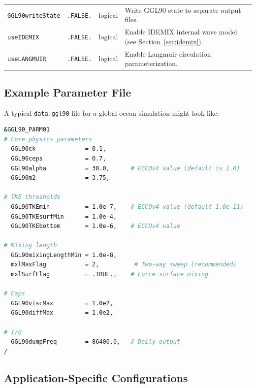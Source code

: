 \documentclass[12pt,letterpaper]{article}
\begin{document}
\begin{table}[h!]
\begin{tabular}{@{}lllp{5.5cm}@{}}
\texttt{GGL90writeState} & \texttt{.FALSE.} & logical & Write GGL90 state
                                                         to separate output
                                                         files. \\[6pt]

\texttt{useIDEMIX} & \texttt{.FALSE.} & logical & Enable IDEMIX internal
                                                   wave model (see Section~\ref{sec:idemix}). \\[6pt]

\texttt{useLANGMUIR} & \texttt{.FALSE.} & logical & Enable Langmuir
                                                     circulation
                                                     parameterization. \\

\bottomrule
\end{tabular}
\end{table}

\subsection{Example Parameter File}

A typical \texttt{data.ggl90} file for a global ocean simulation might look
like:

\begin{lstlisting}[caption={Example \texttt{data.ggl90} parameter file.},language=bash,basicstyle=\ttfamily\small]
&GGL90_PARM01
# Core physics parameters
  GGL90ck              = 0.1,
  GGL90ceps            = 0.7,
  GGL90alpha           = 30.0,      # ECCOv4 value (default is 1.0)
  GGL90m2              = 3.75,

# TKE thresholds
  GGL90TKEmin          = 1.0e-7,    # ECCOv4 value (default 1.0e-11)
  GGL90TKEsurfMin      = 1.0e-4,
  GGL90TKEbottom       = 1.0e-6,    # ECCOv4 value

# Mixing length
  GGL90mixingLengthMin = 1.0e-8,
  mxlMaxFlag           = 2,          # Two-way sweep (recommended)
  mxlSurfFlag          = .TRUE.,    # Force surface mixing

# Caps
  GGL90viscMax         = 1.0e2,
  GGL90diffMax         = 1.0e2,

# I/O
  GGL90dumpFreq        = 86400.0,   # Daily output
/
\end{lstlisting}

\subsection{Application-Specific Configurations}
\end{document}

